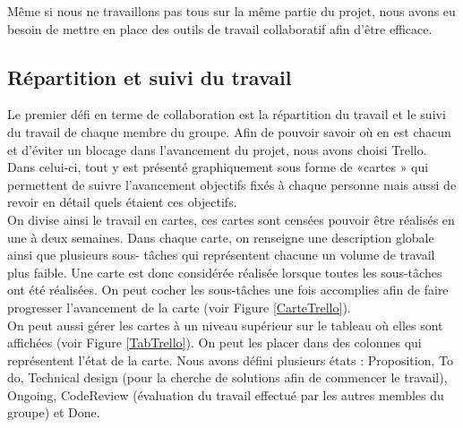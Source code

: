 \documentclass[a4paper]{article}
\begin{document}
Même si nous ne travaillons pas tous sur la même partie du projet, nous avons eu besoin de mettre
en place des outils de travail collaboratif afin d’être efficace.

\subsection{Répartition et suivi du travail}

Le premier défi en terme de collaboration est la répartition du travail et le suivi du travail de
chaque membre du groupe. Afin de pouvoir savoir où en est chacun et d’éviter un blocage dans
l’avancement du projet, nous avons choisi Trello. Dans celui-ci, tout y est présenté graphiquement
sous forme de «cartes » qui permettent de suivre l’avancement objectifs fixés à chaque personne
mais aussi de revoir en détail quels étaient ces objectifs.
\\

On divise ainsi le travail en cartes, ces cartes sont censées pouvoir être réalisés en une à deux
semaines. Dans chaque carte, on renseigne une description globale ainsi que plusieurs sous-
tâches qui représentent chacune un volume de travail plus faible. Une carte est donc considérée
réalisée lorsque toutes les sous-tâches ont été réalisées. On peut cocher les sous-tâches une fois
accomplies afin de faire progresser l’avancement de la carte (voir Figure \ref{CarteTrello}).
\\

On peut aussi gérer les cartes à un niveau supérieur sur le tableau où elles sont affichées (voir Figure \ref{TabTrello}).
On peut les placer dans des colonnes qui représentent l’état de la carte. Nous avons
défini plusieurs états : Proposition, To do, Technical design (pour la cherche de solutions afin de
commencer le travail), Ongoing, CodeReview (évaluation du travail effectué par les autres
membles du groupe) et Done.
\end{document}
